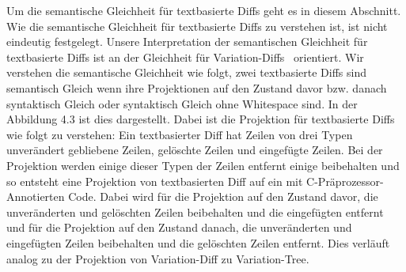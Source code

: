 Um die semantische Gleichheit für textbasierte Diffs geht es in diesem Abschnitt. Wie die semantische Gleichheit für textbasierte Diffs zu verstehen ist, ist nicht eindeutig festgelegt. Unsere Interpretation der semantischen Gleichheit für textbasierte Diffs ist an der Gleichheit für Variation-Diffs~\cite{BSG+:SPLC23} orientiert. Wir verstehen die semantische Gleichheit wie folgt, zwei textbasierte Diffs sind semantisch Gleich wenn ihre Projektionen auf den Zustand davor bzw. danach syntaktisch Gleich oder syntaktisch Gleich ohne Whitespace sind. In der Abbildung 4.3 ist dies dargestellt. Dabei ist die Projektion für textbasierte Diffs wie folgt zu verstehen: Ein textbasierter Diff hat Zeilen von drei Typen unverändert gebliebene Zeilen, gelöschte Zeilen und eingefügte Zeilen. Bei der Projektion werden einige dieser Typen der Zeilen entfernt einige beibehalten und so entsteht eine Projektion von textbasierten Diff auf ein mit C-Präprozessor-Annotierten Code. Dabei wird für die Projektion auf den Zustand davor, die unveränderten und gelöschten Zeilen beibehalten und die eingefügten entfernt und für die Projektion auf den Zustand danach, die unveränderten und eingefügten Zeilen beibehalten und die gelöschten Zeilen entfernt. Dies verläuft analog zu der Projektion von Variation-Diff zu Variation-Tree.

